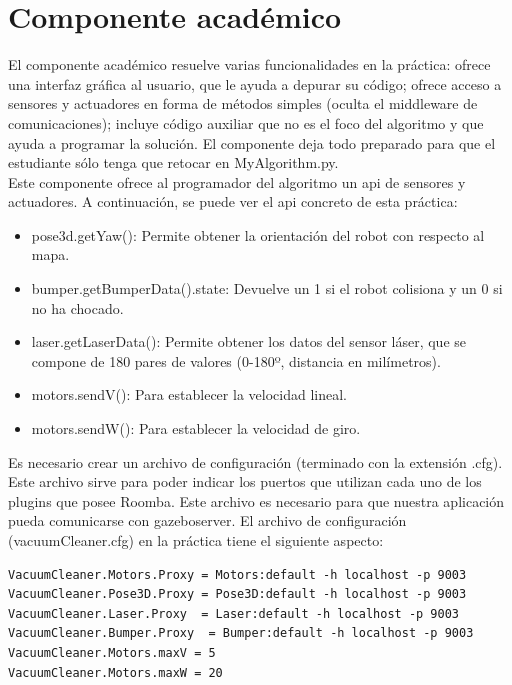 \section{Componente académico}
El componente académico resuelve varias funcionalidades en la práctica: ofrece una interfaz gráfica al usuario, que le ayuda a depurar su código; ofrece acceso a sensores y actuadores en forma de métodos simples (oculta el middleware de comunicaciones); incluye código auxiliar que no es el foco del algoritmo y que ayuda a programar la solución. El componente deja todo preparado para que el estudiante sólo tenga que retocar en MyAlgorithm.py.\\

Este componente ofrece al programador del algoritmo un \acrshort{api} de sensores y actuadores. A continuación, se puede ver el \acrshort{api} concreto de esta práctica:

\begin{itemize}
\item pose3d.getYaw(): Permite obtener la orientación del robot con respecto al mapa.
\item bumper.getBumperData().state: Devuelve un 1 si el robot colisiona y un 0 si no ha chocado.
\item laser.getLaserData(): Permite obtener los datos del sensor láser, que se compone de 180 pares de valores (0-180º, distancia en milímetros).
\item motors.sendV(): Para establecer la velocidad lineal.
\item motors.sendW(): Para establecer la velocidad de giro.

\end{itemize}


Es necesario crear un archivo de configuración (terminado con la extensión .cfg). Este archivo sirve para poder indicar los puertos que utilizan cada uno de los plugins que posee Roomba. Este archivo es necesario para que nuestra aplicación pueda comunicarse con gazeboserver. El archivo de configuración (vacuumCleaner.cfg) en la práctica tiene el siguiente aspecto: 


\vspace{20pt}
	\begin{lstlisting}[frame=single]
VacuumCleaner.Motors.Proxy = Motors:default -h localhost -p 9003
VacuumCleaner.Pose3D.Proxy = Pose3D:default -h localhost -p 9003
VacuumCleaner.Laser.Proxy  = Laser:default -h localhost -p 9003
VacuumCleaner.Bumper.Proxy  = Bumper:default -h localhost -p 9003
VacuumCleaner.Motors.maxV = 5
VacuumCleaner.Motors.maxW = 20

	\end{lstlisting}
	
